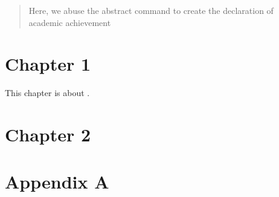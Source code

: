 \documentclass[letterpaper,12pt,twoside,openright]{report}
\begin{document}
    \renewcommand{\abstractname}{Declaration of Academic Achievement}
    \begin{abstract} \thispagestyle{plain} \setcounter{page}{9} %
        Here, we abuse the abstract command to create the declaration of academic achievement
    \end{abstract}
    
    \listoftodos %

    \pagestyle{fancy}
    \fancyhead{}
    \fancyfoot{}
    \fancyfoot[CE,CO]{\thepage}



\chapter{Chapter 1}
%
This chapter is about \cite{example}.

\chapter{Chapter 2}
%

%

\printbibliography

\appendix
\chapter{Appendix A}
\end{document}
